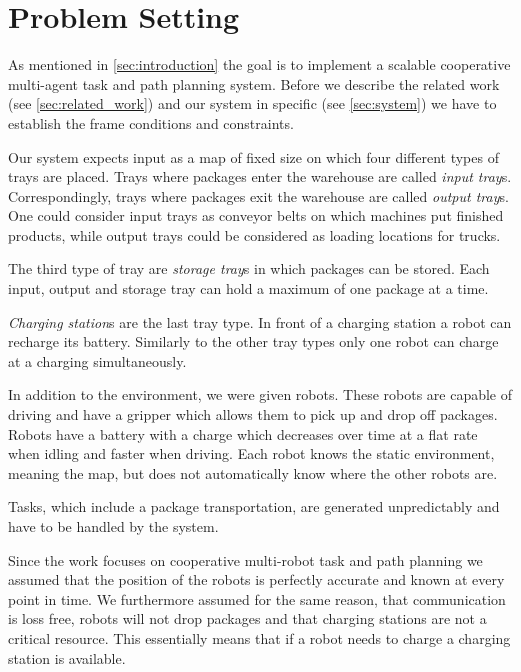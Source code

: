 \documentclass[journal]{IEEEtran}
\newcommand{\compref}[1]{\autoref{#1} \nameref{#1}}
\begin{document}
\section{Problem Setting}
\label{sec:problem_setting}
As mentioned in \compref{sec:introduction} the goal is to implement a scalable cooperative multi-agent task and path planning system. 
Before we describe the related work (see \autoref{sec:related_work}) and our system in specific (see \autoref{sec:system}) we have to establish the frame conditions and constraints.

Our system expects input as a map of fixed size on which four different types of trays are placed.
Trays where packages enter the warehouse are called \textit{input tray}s. Correspondingly, trays where packages exit the warehouse are called \textit{output tray}s. 
One could consider input trays as conveyor belts on which machines put finished products, while output trays could be considered as loading locations for trucks.

The third type of tray are \textit{storage tray}s in which packages can be stored.
Each input, output and storage tray can hold a maximum of one package at a time.

\textit{Charging station}s are the last tray type. In front of a charging station a robot can recharge its battery. 
Similarly to the other tray types only one robot can charge at a charging simultaneously.

In addition to the environment, we were given robots. 
These robots are capable of driving and have a gripper which allows them to pick up and drop off packages. 
Robots have a battery with a charge which decreases over time at a flat rate when idling and faster when driving.
Each robot knows the static environment, meaning the map, but does not automatically know where the other robots are. 

Tasks, which include a package transportation, are generated unpredictably and have to be handled by the system.

Since the work focuses on cooperative multi-robot task and path planning we assumed that the position of the robots is perfectly accurate and known at every point in time.
We furthermore assumed for the same reason, that communication is loss free, robots will not drop packages and that charging stations are not a critical resource.
This essentially means that if a robot needs to charge a charging station is available. 
\end{document}
